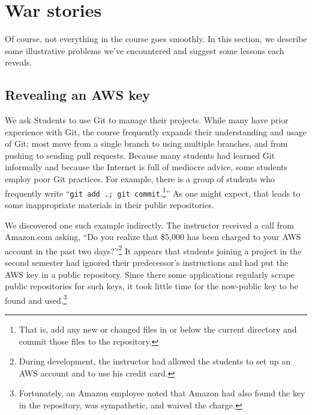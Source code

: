 \section{War stories}

Of course, not everything in the course goes smoothly.  In this section,
we describe some illustrative problems we've encountered and suggest
some lessons each reveals. 

\subsection{Revealing an AWS key}

We ask Students to use Git to manage their projects.  While many
have prior experience with Git, the course
frequently expands their understanding and usage of Git; most move
from a single branch to using multiple branches, and from pushing
to sending pull requests.  Because many students had learned Git
informally and because the Internet is full of mediocre advice,
some students employ poor Git practices.  For example, there is a
group of students who frequently write ``\texttt{git add .; git
commit}.\footnote{That is, add any new or changed files in or below
the current directory and commit those files to the repository.}''
As one might expect, that leads to some inappropriate materials in
their public repositories.

We discovered one such example indirectly.  The instructor received
a call from Amazon.com asking, ``Do you realize that \$5,000 has
been charged to your AWS account in the past two days?''\footnote{During
development, the instructor had allowed the students to set up an
AWS account and to use his credit card.}  It appears that students
joining a project in the second semester had ignored their predecessor's
instructions and had put the AWS key in a public repository.  Since
there some applications regularly scrape public repositories for such
keys, it took little time for the now-public key to be found and
used.\footnote{Fortunately, an Amazon employee noted that Amazon
had also found the key in the repository, was sympathetic, and
waived the charge.}

